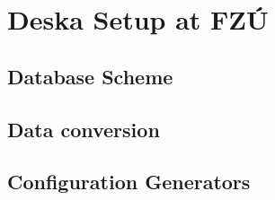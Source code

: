 \documentclass[deska]{subfiles}
\begin{document}
\chapter{Deska Setup at FZÚ}
\label{sec:fzu-setup}

\begin{abstract}
\end{abstract}

\section{Database Scheme}
\label{sec:fzu-scheme}

\section{Data conversion}
\label{sec:fzu-farmdb}

\section{Configuration Generators}
\label{sec:fzu-cfggen}
\end{document}
